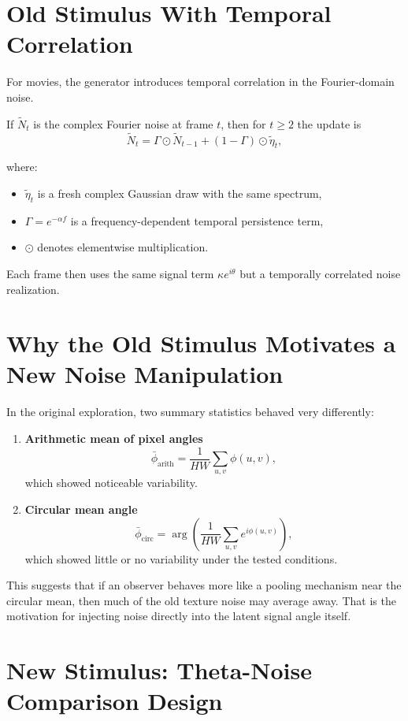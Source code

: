 \documentclass[11pt]{article}
\begin{document}
\section{Old Stimulus With Temporal Correlation}

For movies, the generator introduces temporal correlation in the Fourier-domain
noise.

If $\tilde{N}_t$ is the complex Fourier noise at frame $t$, then for
$t \ge 2$ the update is
\[
\tilde{N}_t
= \Gamma \odot \tilde{N}_{t-1} + (1-\Gamma) \odot \tilde{\eta}_t,
\]

where:
\begin{itemize}[leftmargin=2em]
\item $\tilde{\eta}_t$ is a fresh complex Gaussian draw with the same spectrum,
\item $\Gamma = e^{-\alpha f}$ is a frequency-dependent temporal persistence
term,
\item $\odot$ denotes elementwise multiplication.
\end{itemize}

Each frame then uses the same signal term $\kappa e^{i\theta}$ but a
temporally correlated noise realization.

\section{Why the Old Stimulus Motivates a New Noise Manipulation}

In the original exploration, two summary statistics behaved very differently:

\begin{enumerate}[leftmargin=2em]
\item \textbf{Arithmetic mean of pixel angles}
\[
\bar{\phi}_{\mathrm{arith}} = \frac{1}{HW} \sum_{u,v} \phi(u,v),
\]
which showed noticeable variability.

\item \textbf{Circular mean angle}
\[
\bar{\phi}_{\mathrm{circ}}
= \arg\left(\frac{1}{HW} \sum_{u,v} e^{i\phi(u,v)}\right),
\]
which showed little or no variability under the tested conditions.
\end{enumerate}

This suggests that if an observer behaves more like a pooling mechanism near
the circular mean, then much of the old texture noise may average away. That
is the motivation for injecting noise directly into the latent signal angle
itself.

\section{New Stimulus: Theta-Noise Comparison Design}
\end{document}
